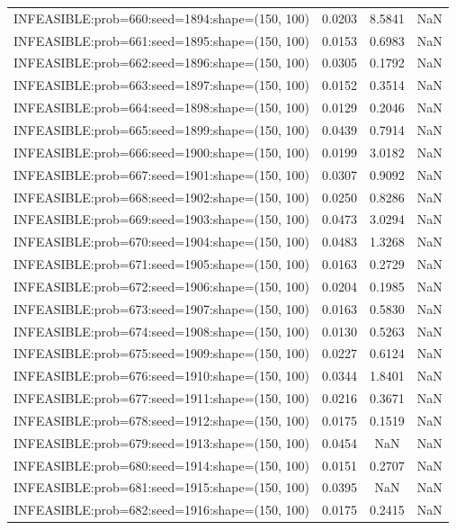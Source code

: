 \begin{longtable}{lccc}
INFEASIBLE:prob=660:seed=1894:shape=(150, 100) & 0.0203 &  8.5841 &    NaN \\
INFEASIBLE:prob=661:seed=1895:shape=(150, 100) & 0.0153 &  0.6983 &    NaN \\
INFEASIBLE:prob=662:seed=1896:shape=(150, 100) & 0.0305 &  0.1792 &    NaN \\
INFEASIBLE:prob=663:seed=1897:shape=(150, 100) & 0.0152 &  0.3514 &    NaN \\
INFEASIBLE:prob=664:seed=1898:shape=(150, 100) & 0.0129 &  0.2046 &    NaN \\
INFEASIBLE:prob=665:seed=1899:shape=(150, 100) & 0.0439 &  0.7914 &    NaN \\
INFEASIBLE:prob=666:seed=1900:shape=(150, 100) & 0.0199 &  3.0182 &    NaN \\
INFEASIBLE:prob=667:seed=1901:shape=(150, 100) & 0.0307 &  0.9092 &    NaN \\
INFEASIBLE:prob=668:seed=1902:shape=(150, 100) & 0.0250 &  0.8286 &    NaN \\
INFEASIBLE:prob=669:seed=1903:shape=(150, 100) & 0.0473 &  3.0294 &    NaN \\
INFEASIBLE:prob=670:seed=1904:shape=(150, 100) & 0.0483 &  1.3268 &    NaN \\
INFEASIBLE:prob=671:seed=1905:shape=(150, 100) & 0.0163 &  0.2729 &    NaN \\
INFEASIBLE:prob=672:seed=1906:shape=(150, 100) & 0.0204 &  0.1985 &    NaN \\
INFEASIBLE:prob=673:seed=1907:shape=(150, 100) & 0.0163 &  0.5830 &    NaN \\
INFEASIBLE:prob=674:seed=1908:shape=(150, 100) & 0.0130 &  0.5263 &    NaN \\
INFEASIBLE:prob=675:seed=1909:shape=(150, 100) & 0.0227 &  0.6124 &    NaN \\
INFEASIBLE:prob=676:seed=1910:shape=(150, 100) & 0.0344 &  1.8401 &    NaN \\
INFEASIBLE:prob=677:seed=1911:shape=(150, 100) & 0.0216 &  0.3671 &    NaN \\
INFEASIBLE:prob=678:seed=1912:shape=(150, 100) & 0.0175 &  0.1519 &    NaN \\
INFEASIBLE:prob=679:seed=1913:shape=(150, 100) & 0.0454 &     NaN &    NaN \\
INFEASIBLE:prob=680:seed=1914:shape=(150, 100) & 0.0151 &  0.2707 &    NaN \\
INFEASIBLE:prob=681:seed=1915:shape=(150, 100) & 0.0395 &     NaN &    NaN \\
INFEASIBLE:prob=682:seed=1916:shape=(150, 100) & 0.0175 &  0.2415 &    NaN \\

\end{longtable}
